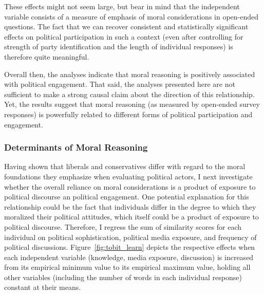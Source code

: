 \documentclass[12pt]{article}
\begin{document}
These effects might not seem large, but bear in mind that the independent variable consists of a measure of emphasis of moral considerations in open-ended questions. The fact that we can recover consistent and statistically significant effects on political participation in such a context (even after controlling for strength of party identification and the length of individual responses) is therefore quite meaningful.

Overall then, the analyses indicate that moral reasoning is positively associated with political engagement. That said, the analyses presented here are not sufficient to make a strong causal claim about the direction of this relationship. Yet, the results suggest that moral reasoning (as measured by open-ended survey responses) is powerfully related to different forms of political participation and engagement.



\subsubsection{Determinants of Moral Reasoning}

Having shown that liberals and conservatives differ with regard to the moral foundations they emphasize when evaluating political actors, I next investigate whether the overall reliance on moral considerations is a product of exposure to political discourse an political engagement. One potential explanation for this relationship could be the fact that individuals differ in the degree to which they moralized their political attitudes, which itself could be a product of exposure to political discourse. Therefore, I regress the sum of similarity scores for each individual on political sophistication, political media exposure, and frequency of political discussions. Figure~\ref{fig:tobit_learn} depicts the respective effects when each independent variable (knowledge, media exposure, discussion) is increased from its empirical minimum value to its empirical maximum value, holding all other variables (including the number of words in each individual response) constant at their means.
\end{document}
